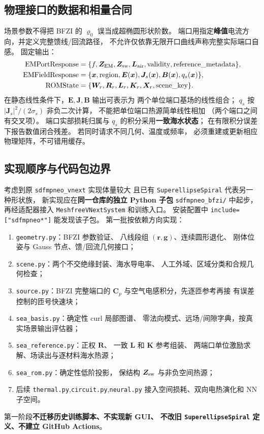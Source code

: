 \subsection{物理接口的数据和相量合同}
场景参数不得把 BFZI 的 \(\varrho_0\) 误当成超椭圆形状阶数。
端口用指定\textbf{峰值}电流方向，并定义完整馈线/回流路径，
不允许仅依靠无限开口曲线声称完整实际端口自感。
固定输出：
\[
\begin{aligned}
\mathrm{EMPortResponse}&=\{f,\bm Z_{\rm EM},
\bm Z_{\rm sw},\bm L_{\rm air},
\mathrm{validity},\mathrm{reference\_metadata}\},\\
\mathrm{EMFieldResponse}&=\{\bm x,\mathrm{region},
\bm E(\bm x),\bm J_s(\bm x),\bm B(\bm x),q_s(\bm x)\},\\
\mathrm{ROMState}&=\{\bm W_r,\bm R_r,\bm L_r,\bm K_r,
\bm X_r,\mathrm{scene\_key}\}.
\end{aligned}
\]
在静态线性条件下，\(\bm E,\bm J,\bm B\) 输出可表示为
两个单位端口基场的线性组合；
\(q_s\) 按 \(|\bm J_s|^2/(2\sigma_s)\) 非负二次计算，
不能把单位端口热源简单线性相加
（两个端口之间有交叉项）。
端口实部损耗归属与 \(q_s\) 的积分采用\textbf{一致海水状态}；
在有限积分误差下报告数值闭合残差。
若同时请求不同几何、温度或频率，
必须重建或更新相应物理矩阵，不可错用缓存。

\subsection{实现顺序与代码包边界}
考虑到原 \texttt{sdfmpneo\_vnext} 实现体量较大
且已有 \texttt{SuperellipseSpiral} 代表另一种形状族，
新实现应在\textbf{同一仓库的独立 Python 子包}
\texttt{sdfmpneo\_bfzi/} 中起步，再经适配器接入
\texttt{MeshfreeVNextSystem} 和训练入口。
安装配置中 \texttt{include=["sdfmpneo*"]} 能发现该子包。
第一批按依赖方向实现：
\begin{enumerate}
\item \texttt{geometry.py}：BFZI 参数验证、
八线段组 \((\bm r,\bm g)\)、连续圆形退化、
刚体位姿与 Gauss 节点、馈/回流几何接口；
\item \texttt{scene.py}：两个不交绝缘封装、海水导电率、
人工外域、区域分类和合规几何检查；
\item \texttt{source.py}：BFZI 完整端口的
\(\bm C_p\) 与空气电感积分，先逐匝参考再接
有误差控制的匝号快速块；
\item \texttt{sea\_basis.py}：确定性 curl 局部图谱、
零法向模式、远场/间隙字典，按真实场景输出评估器；
\item \texttt{sea\_reference.py}：正权 \(\bm R\)、
一致 \(\bm L\) 和 \(\bm K\) 参考组装、
两端口单位激励求解、场读出与逐材料海水热源；
\item \texttt{sea\_rom.py}：确定性低阶投影，
保结构 \(\bm Z_{\rm sw}\) 与非负空间热源；
\item 后续 \texttt{thermal.py},\texttt{circuit.py},\texttt{neural.py}
接入空间损耗、双向电热演化和 NN 子空间。
\end{enumerate}
第一阶段\textbf{不迁移历史训练脚本、不实现新 GUI、
不改旧 \texttt{SuperellipseSpiral} 定义、不建立 GitHub Actions}。

